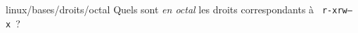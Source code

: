 \begin{question}{linux/bases/droits/octal}
  Quels sont {\em en octal} les droits correspondants à {\tt
    r-xrw---x}~?
  \begin{reponses}
    \lastchoices
  \end{reponses}
\end{question}
